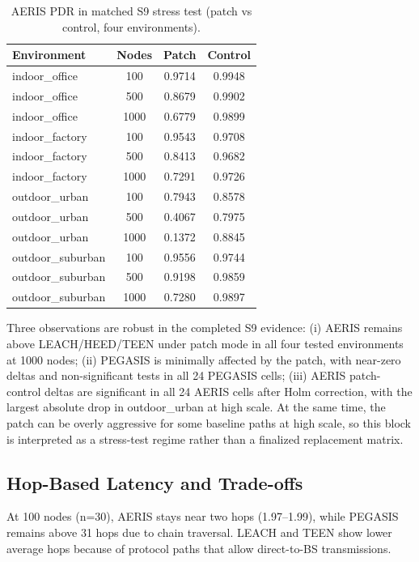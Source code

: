 \documentclass[sensors,article,submit,moreauthors,pdftex]{Definitions/mdpi}
\begin{document}
\begin{table}[H]
\caption{AERIS PDR in matched S9 stress test (patch vs control, four environments).}
\label{tab:s9_patch_control}
\centering
\begin{tabular}{lccc}
\toprule
Environment & Nodes & Patch & Control \\
\midrule
indoor\_office & 100  & 0.9714 & 0.9948 \\
indoor\_office & 500  & 0.8679 & 0.9902 \\
indoor\_office & 1000 & 0.6779 & 0.9899 \\
indoor\_factory & 100  & 0.9543 & 0.9708 \\
indoor\_factory & 500  & 0.8413 & 0.9682 \\
indoor\_factory & 1000 & 0.7291 & 0.9726 \\
outdoor\_urban & 100  & 0.7943 & 0.8578 \\
outdoor\_urban & 500  & 0.4067 & 0.7975 \\
outdoor\_urban & 1000 & 0.1372 & 0.8845 \\
outdoor\_suburban & 100  & 0.9556 & 0.9744 \\
outdoor\_suburban & 500  & 0.9198 & 0.9859 \\
outdoor\_suburban & 1000 & 0.7280 & 0.9897 \\
\bottomrule
\end{tabular}
\end{table}

Three observations are robust in the completed S9 evidence: (i) AERIS remains above LEACH/HEED/TEEN under patch mode in all four tested environments at 1000 nodes; (ii) PEGASIS is minimally affected by the patch, with near-zero deltas and non-significant tests in all 24 PEGASIS cells; (iii) AERIS patch-control deltas are significant in all 24 AERIS cells after Holm correction, with the largest absolute drop in outdoor\_urban at high scale. At the same time, the patch can be overly aggressive for some baseline paths at high scale, so this block is interpreted as a stress-test regime rather than a finalized replacement matrix.

\subsection{Hop-Based Latency and Trade-offs}
At 100 nodes (n=30), AERIS stays near two hops (1.97--1.99), while PEGASIS remains above 31 hops due to chain traversal. LEACH and TEEN show lower average hops because of protocol paths that allow direct-to-BS transmissions.
\end{document}
